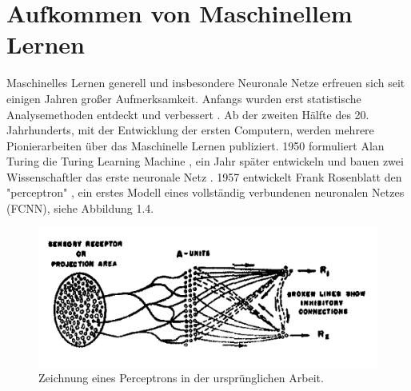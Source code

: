 \documentclass{thesisclass}
\begin{document}
\section{Aufkommen von Maschinellem Lernen}

Maschinelles Lernen generell und insbesondere Neuronale Netze erfreuen sich seit einigen Jahren großer Aufmerksamkeit. Anfangs wurden erst statistische Analysemethoden entdeckt und verbessert \cite{bayes1763essay}\cite{legendre1805nouvelles}\cite{markov2006example}. %
Ab der zweiten Hälfte des 20. Jahrhunderts, mit der Entwicklung der ersten Computern, werden mehrere Pionierarbeiten über das Maschinelle Lernen publiziert. 1950 formuliert Alan Turing die Turing Learning Machine \cite{machinery1950computing}, ein Jahr später entwickeln und bauen zwei Wissenschaftler das erste neuronale Netz \cite{snarc}. 1957 entwickelt Frank Rosenblatt den "perceptron" \cite{rosenblatt1958perceptron}, ein erstes Modell eines vollständig verbundenen neuronalen Netzes (\gls{FCNN}), siehe Abbildung 1.4.

\begin{figure}[H]
  \center
  \includegraphics[width=\textwidth]{images/perceptron.png}
  \caption{Zeichnung eines Perceptrons in der ursprünglichen Arbeit. \cite{rosenblatt1958perceptron}}
  \label{fig:perceptron}
\end{figure}
\end{document}
